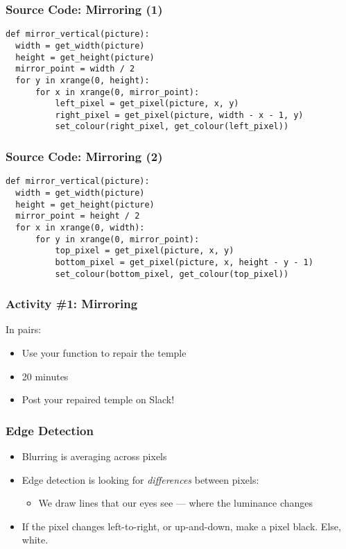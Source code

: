 
\begin{frame}[fragile]
	\frametitle{Source Code: Mirroring (1)}
	
\begin{lstlisting}
def mirror_vertical(picture):
  width = get_width(picture)
  height = get_height(picture)
  mirror_point = width / 2
  for y in xrange(0, height):
      for x in xrange(0, mirror_point):
          left_pixel = get_pixel(picture, x, y)
          right_pixel = get_pixel(picture, width - x - 1, y)
          set_colour(right_pixel, get_colour(left_pixel))
\end{lstlisting}

\end{frame}

\begin{frame}[fragile]
	\frametitle{Source Code: Mirroring (2)}
	
\begin{lstlisting}
def mirror_vertical(picture):
  width = get_width(picture)
  height = get_height(picture)
  mirror_point = height / 2
  for x in xrange(0, width):
      for y in xrange(0, mirror_point):
          top_pixel = get_pixel(picture, x, y)
          bottom_pixel = get_pixel(picture, x, height - y - 1)
          set_colour(bottom_pixel, get_colour(top_pixel))
\end{lstlisting}

\end{frame}

\begin{frame}
	\frametitle{Activity \#1: Mirroring}
	
	In pairs:
	
	\vspace{2em}
	
	\begin{itemize}		
		\item Use your function to repair the temple
		\item 20 minutes
		\item Post your repaired temple on Slack!
	\end{itemize}
\end{frame}


\begin{frame}
	\frametitle{Edge Detection}
	
	\begin{itemize}		
		\item Blurring is averaging across pixels
		\item Edge detection is looking for \textit{differences} between pixels:
		\begin{itemize}
			\item We draw lines that our eyes see --- where the luminance changes
		\end{itemize}	
		\item If the pixel changes left-to-right, or up-and-down, make a pixel black. Else, white.
	\end{itemize}
\end{frame}


